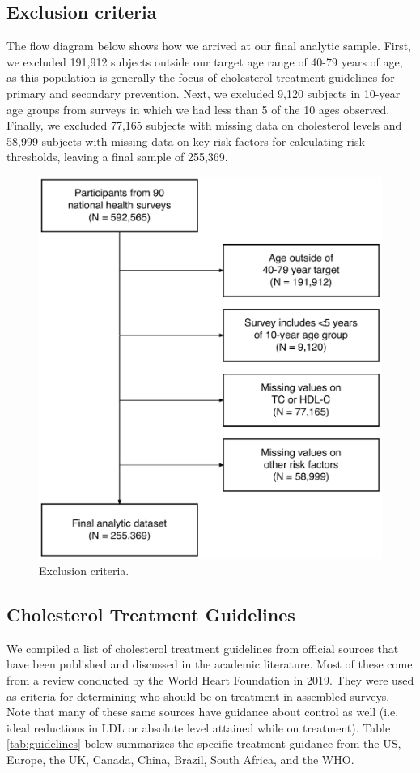 \documentclass[12pt]{article}
\begin{document}
\begin{appendix}
    \subsection{Exclusion criteria}
    The flow diagram below shows how we arrived at our final analytic sample. First, we excluded 191,912 subjects outside our target age range of 40-79 years of age, as this population is generally the focus of cholesterol treatment guidelines for primary and secondary prevention. Next, we excluded 9,120 subjects in 10-year age groups from surveys in which we had less than 5 of the 10 ages observed. Finally, we excluded 77,165 subjects with missing data on cholesterol levels and 58,999 subjects with missing data on key risk factors for calculating risk thresholds, leaving a final sample of 255,369.
    \begin{figure}[H]
        \centering
        \includegraphics[width=0.5\linewidth]{../3_figures/figS_STROBE.pdf}
        \caption{Exclusion criteria.}
        \label{fig:exclusion}
    \end{figure}

    \subsection{Cholesterol Treatment Guidelines}

    We compiled a list of cholesterol treatment guidelines from official sources that have been published and discussed in the academic literature. Most of these come from a review conducted by the World Heart Foundation in 2019. They were used as criteria for determining who should be on treatment in assembled surveys. Note that many of these same sources have guidance about control as well (i.e. ideal reductions in LDL or absolute level attained while on treatment). Table \ref{tab:guidelines} below summarizes the specific treatment guidance from the US, Europe, the UK, Canada, China, Brazil, South Africa, and the WHO. 


\end{appendix}
\end{document}
